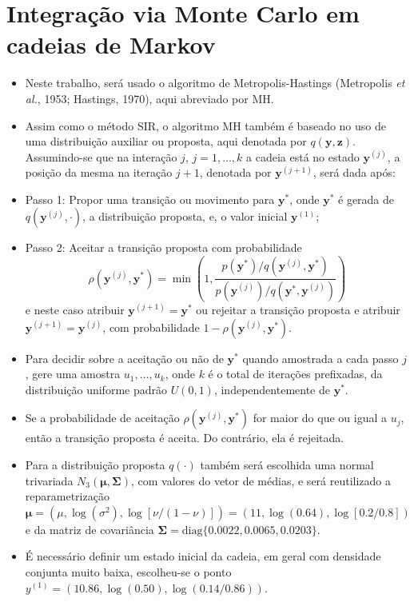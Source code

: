 \documentclass[9pt]{beamer}
\begin{document}
\section{Integração via Monte Carlo em cadeias de Markov}
\begin{frame}
\begin{itemize}
\justifying	
\item Neste trabalho, será usado o algoritmo de Metropolis-Hastings (Metropolis \textit{et al.}, 1953; Hastings, 1970), aqui abreviado por MH.
\item Assim como o método SIR, o algoritmo MH também é baseado no uso de uma distribuição auxiliar ou proposta, aqui denotada por $q(\bm{y}, \bm{z})$. Assumindo-se que na interação $j$, $j = 1, \ldots, k$ a cadeia está no estado $\bm{y}^{(j)}$, a posição da mesma na iteração $j + 1$, denotada por $\bm{y}^{(j + 1)}$, será dada após:
\item Passo 1: Propor uma transição ou movimento para $\bm{y}^*$, onde $\bm{y}^*$ é gerada de $q(\bm{y}^{(j)}, \cdot)$, a distribuição proposta, e, o valor inicial $\mathbf{y}^{(1)}$;
\item Passo 2: Aceitar a transição proposta com probabilidade
\begin{equation}\label{eq:mh_tranprob}
\rho(\bm{y}^{(j)}, \bm{y}^*) = \min\left(1, \dfrac{p(\bm{y}^*) / q(\bm{y}^{(j)}, \bm{y}^*)}{p(\bm{y}^{(j)}) / q(\bm{y}^*, \bm{y}^{(j)})}\right)
\end{equation}
e neste caso atribuir $\bm{y}^{(j + 1)} = \bm{y}^*$ ou rejeitar a transição proposta e atribuir $\bm{y}^{(j + 1)} = \bm{y}^{(j)}$, com probabilidade $1 - \rho(\bm{y}^{(j)}, \bm{y}^*)$.
\end{itemize}
\end{frame}
\begin{frame}
\begin{itemize}
\justifying	
\item Para decidir sobre a aceitação ou não de $\bm{y}^*$ quando amostrada a cada passo $j$, gere uma amostra $u_1, \ldots, u_k$, onde $k$ é o total de iterações prefixadas, da distribuição uniforme padrão $U(0,1)$, independentemente de $\bm{y}^*$.
\item Se a probabilidade de aceitação $\rho(\bm{y}^{(j)}, \bm{y}^*)$ for maior do que ou igual a $u_j$, então a transição proposta é aceita. Do contrário, ela é rejeitada.
\item Para a distribuição proposta $q(\cdot)$ também será escolhida uma normal trivariada $N_3(\bm{\mu}, \bm{\Sigma})$, com valores do vetor de médias, e será reutilizado a reparametrização $\bm{\mu} = (\mu, \log(\sigma^2), \log[\nu/(1-\nu)]) = (11, \log(0.64), \log[0.2/0.8])$ e da matriz de covariância $\bm{\Sigma} = \textrm{diag}\{0.0022, 0.0065, 0.0203\}$.
\item É necessário definir um estado inicial da cadeia, em geral com densidade conjunta muito baixa, escolheu-se o ponto $y^{(1)} = (10.86, \log(0.50),\log(0.14/0.86))$. 
\end{itemize}
\end{frame}
\end{document}
